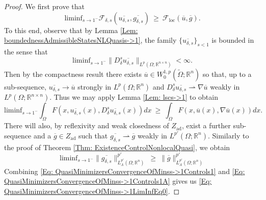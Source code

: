 \documentclass[11pt, reqno]{amsart}   	%
\theoremstyle{plain}
\numberwithin{equation}{section}
\def\de{\delta}
\def\La{\Lambda}
\def\Om{\Omega}
\def\R{\mathbb{R}}
\def\grad{\nabla}
\def\liminf{\text{liminf}}
\def\loc{\text{loc}}
\begin{document}
 \begin{proof}
  We first prove that
     \begin{equation}\label{Eq: QuasiMinimizersConvergenceOfMinss->1LimInfEq0}
          \liminf_{s \rightarrow 1^-}\mathcal{F}_{\de, s}(\overline{u_{\de, s}}, \overline{g_{\de, s}}) \ \geq \ \mathcal{F}_{\loc}(\overline{u}, \overline{g}).
     \end{equation}
     To this end, observe that by Lemma \ref{Lem: boundednessAdmissibleStatesNLQuasis->1}, the family $\{\overline{u_{\de, s}}\}_{s < 1}$ is bounded in the sense that 
     \begin{equation}\label{Eq: liminfs->1Conv}
     \liminf_{s \rightarrow 1^-}\|D^s_{\de}\overline{u_{\de, s}}\|_{L^p(\Om; \R^{n \times n})} < \infty.
     \end{equation}
     Then by the compactness result \cite[Lemma 9]{cueto2023variational} there exists $\overline{u} \in W^{1, p}_0(\widetilde{\Om}; \R^n)$ so that, up to a sub-sequence, $\overline{u_{\de, s}} \rightarrow \overline{u}$ strongly in $L^p(\Om; \R^n)$ and $D^s_{\de}\overline{u_{\de, s}} \rightharpoonup \grad \overline{u}$ weakly in $L^p(\Om; \R^{n \times n})$. Thus we may apply Lemma \ref{Lem: lscs->1} to obtain
    \begin{equation}\label{Eq: QuasiMinimizersConvergenceOfMinss->1Controls1}
        \liminf_{s \rightarrow 1^-}\int_{\Om}F(x, \overline{u_{\de, s}}(x), D^s_{\de}\overline{u_{\de, s}}(x))dx \ \geq \ \int_{\Om}F(x, \overline{u}(x), \grad \overline{u}(x))dx.
    \end{equation}
There will also, by reflexivity and weak closedness of $Z_{\text{ad}}$, exist a further sub-sequence and a $\overline{g} \in Z_{\text{ad}}$ such that $\overline{g_{\de, s}} \rightharpoonup \overline{g}$ weakly in $L^{p'}(\Om; \R^n)$. Similarly to the proof of Theorem \ref{Thm: ExistenceControlNonlocalQuasi}, we obtain 
\begin{equation}\label{Eq: QuasiMinimizersConvergenceOfMinss->1Controls1A}
    \liminf_{s \rightarrow 1^-}\|\overline{g_{\de, s}}\|^{p'}_{L^{p'}_{\La}(\Om; \R^n)} \ \geq \ \|\overline{g}\|^{p'}_{L^{p'}_{\La}(\Om; \R^n)}
\end{equation}
Combining \eqref{Eq: QuasiMinimizersConvergenceOfMinss->1Controls1} and \eqref{Eq: QuasiMinimizersConvergenceOfMinss->1Controls1A} gives us \eqref{Eq: QuasiMinimizersConvergenceOfMinss->1LimInfEq0}.


\end{proof}
\end{document}
